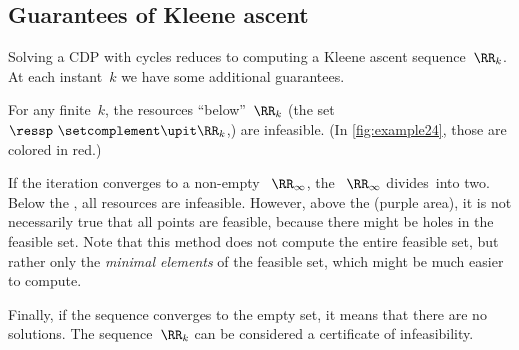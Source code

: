 \subsection{Guarantees of Kleene ascent}

Solving a CDP with cycles reduces to computing a Kleene ascent sequence~$\RR_{k}$.
At each instant~$k$ we have some additional guarantees.

For any finite~$k$, the resources ``below''~$\RR_{k}$ (the set~$\ressp\ \setcomplement\upit\RR_{k}$,) are infeasible.
(In \cref{fig:example24}, those are colored in red.)

If the iteration converges to a non-empty ~$\RR_{\infty}$, the ~$\RR_{\infty}$ divides~\ressp into two.
Below the , all resources are infeasible.
However, above the  (purple area), it is not necessarily true that all points are feasible, because there might be holes in the feasible set.
Note that this method does not compute the entire feasible set, but rather only the \emph{minimal elements} of the feasible set, which might be much easier to compute.

Finally, if the sequence converges to the empty set, it means that there are no solutions.
The sequence~$\RR_{k}$ can be considered a certificate of infeasibility.

